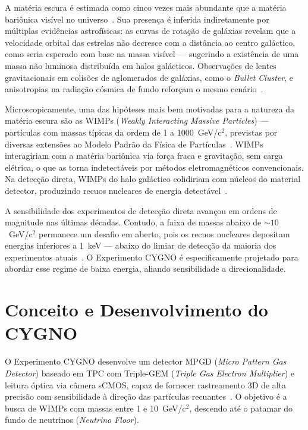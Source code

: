\documentclass[
       oneside,
       english,
       brazil
       ]{abntbibufjf}
\begin{document}
A matéria escura é estimada como cinco vezes mais abundante que a matéria
bariônica visível no universo~\cite{bertone2005particle}. Sua presença é
inferida indiretamente por múltiplas evidências astrofísicas: as curvas de
rotação de galáxias revelam que a velocidade orbital das estrelas não decresce
com a distância ao centro galáctico, como seria esperado com base na massa
visível — sugerindo a existência de uma massa não luminosa distribuída em
halos galácticos. Observações de lentes gravitacionais em colisões de
aglomerados de galáxias, como o \textit{Bullet Cluster}, e anisotropias na
radiação cósmica de fundo reforçam o mesmo cenário~\cite{bertone2005particle}.

Microscopicamente, uma das hipóteses mais bem motivadas para a natureza da
matéria escura são as WIMPs (\textit{Weakly Interacting Massive Particles})
— partículas com massas típicas da ordem de 1 a 1000~GeV/c$^2$, previstas
por diversas extensões ao Modelo Padrão da Física de
Partículas~\cite{schumann2019direct}. WIMPs interagiriam com a matéria
bariônica via força fraca e gravitação, sem carga elétrica, o que as torna
indetectáveis por métodos eletromagnéticos convencionais. Na detecção direta,
WIMPs do halo galáctico colidiriam com núcleos do material detector,
produzindo recuos nucleares de energia
detectável~\cite{goodman1985detectability}.

A sensibilidade dos experimentos de detecção direta avançou em ordens de
magnitude nas últimas décadas. Contudo, a faixa de massas abaixo de
${\sim}10$~GeV/c$^2$ permanece um desafio em aberto, pois os recuos nucleares
depositam energias inferiores a 1~keV — abaixo do limiar de detecção da
maioria dos experimentos atuais~\cite{liu2017current}. O Experimento CYGNO é
especificamente projetado para abordar esse regime de baixa energia, aliando
sensibilidade a direcionalidade.

\section{Conceito e Desenvolvimento do CYGNO}
\label{sec:cygno_concept}

O Experimento CYGNO desenvolve um detector MPGD (\textit{Micro Pattern Gas
Detector}) baseado em TPC com Triple-GEM (\textit{Triple Gas Electron
Multiplier}) e leitura óptica via câmera sCMOS, capaz de fornecer rastreamento
3D de alta precisão com sensibilidade à direção das partículas
recuantes~\cite{bib:eps}. O objetivo é a busca de WIMPs com massas entre 1 e
10~GeV/c$^2$, descendo até o patamar do fundo de neutrinos (\textit{Neutrino
Floor}).
\end{document}
